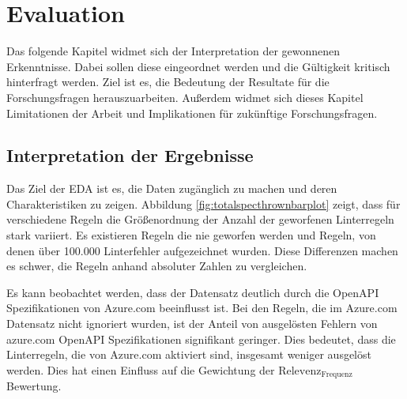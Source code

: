 \section{Evaluation} \label{sec:evaluation}

Das folgende Kapitel widmet sich der Interpretation der gewonnenen Erkenntnisse. Dabei sollen diese eingeordnet werden und die Gültigkeit kritisch hinterfragt werden. Ziel ist es, die Bedeutung der Resultate für die Forschungsfragen herauszuarbeiten. Außerdem widmet sich dieses Kapitel Limitationen der Arbeit und Implikationen für zukünftige Forschungsfragen. 

\subsection{Interpretation der Ergebnisse} \label{sec:interpretationderergebnisse}
Das Ziel der \acs{EDA} ist es, die Daten zugänglich zu machen und deren Charakteristiken zu zeigen. Abbildung \ref{fig:totalspecthrownbarplot} zeigt, dass für verschiedene Regeln die Größenordnung der Anzahl der geworfenen Linterregeln stark variiert. Es existieren Regeln die nie geworfen werden und Regeln, von denen über 100.000 Linterfehler aufgezeichnet wurden. Diese Differenzen machen es schwer, die Regeln anhand absoluter Zahlen zu vergleichen.

Es kann beobachtet werden, dass der Datensatz deutlich durch die OpenAPI Spezifikationen von Azure.com beeinflusst ist. Bei den Regeln, die im Azure.com Datensatz nicht ignoriert wurden, ist der Anteil von ausgelösten Fehlern von azure.com OpenAPI Spezifikationen signifikant geringer. Dies bedeutet, dass die Linterregeln, die von Azure.com aktiviert sind, insgesamt weniger ausgelöst werden. Dies hat einen Einfluss auf die Gewichtung der $\text{Relevenz}_\text{Frequenz}$ Bewertung.

